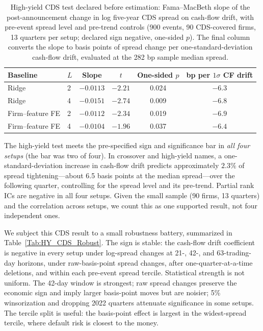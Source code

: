 \documentclass[pdflatex,sn-mathphys-num]{sn-jnl}%
\theoremstyle{thmstyleone}%
\theoremstyle{thmstyletwo}%
\theoremstyle{thmstylethree}%
\begin{document}
\begin{table}[!htbp]
\centering
\caption{High-yield CDS test declared before estimation: Fama--MacBeth slope of the post-announcement change in log five-year CDS spread on cash-flow drift, with pre-event spread level and pre-trend controls (900 events, 90 CDS-covered firms, 13 quarters per setup; declared sign negative, one-sided $p$). The final column converts the slope to basis points of spread change per one-standard-deviation cash-flow drift, evaluated at the 282 bp sample median spread.}
\label{Tab:HY_CDS}
\begin{tabular}{llcccc}
\toprule
Baseline & $L$ & Slope & $t$ & One-sided $p$ & bp per $1\sigma$ CF drift \\
\midrule
Ridge              & 2 & $-0.0113$ & $-2.21$ & 0.024 & $-6.3$ \\
Ridge              & 4 & $-0.0151$ & $-2.74$ & 0.009 & $-6.8$ \\
Firm--feature FE & 2 & $-0.0112$ & $-2.34$ & 0.019 & $-6.9$ \\
Firm--feature FE & 4 & $-0.0104$ & $-1.96$ & 0.037 & $-6.4$ \\
\bottomrule
\end{tabular}
\end{table}

The high-yield test meets the pre-specified sign and significance bar in \emph{all four setups} (the bar was two of four). In crossover and high-yield names, a one-standard-deviation increase in cash-flow drift predicts approximately $2.3\%$ of spread tightening---about 6.5 basis points at the median spread---over the following quarter, controlling for the spread level and its pre-trend. Partial rank ICs are negative in all four setups. Given the small sample (90 firms, 13 quarters) and the correlation across setups, we count this as one supported result, not four independent ones.

We subject this CDS result to a small robustness battery, summarized in Table~\ref{Tab:HY_CDS_Robust}. The sign is stable: the cash-flow drift coefficient is negative in every setup under log-spread changes at 21-, 42-, and 63-trading-day horizons, under raw-basis-point spread changes, after one-quarter-at-a-time deletions, and within each pre-event spread tercile. Statistical strength is not uniform. The 42-day window is strongest; raw spread changes preserve the economic sign and imply larger basis-point moves but are noisier; 5\% winsorization and dropping 2022 quarters attenuate significance in some setups. The tercile split is useful: the basis-point effect is largest in the widest-spread tercile, where default risk is closest to the money.
\end{document}
